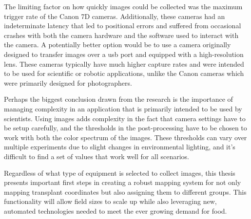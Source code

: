 The limiting factor on how quickly images could be collected was the maximum trigger rate of the Canon 7D cameras.  Additionally, these cameras had an indeterminate latency that led to positional errors and suffered from occasional crashes with both the camera hardware and the software used to interact with the camera.  A potentially better option would be to use a camera originally designed to transfer images over a \acf{usb} port and equipped with a high-resolution lens.  These cameras typically have much higher capture rates and were intended to be used for scientific or robotic applications, unlike the Canon cameras which were primarily designed for photographers. 

Perhaps the biggest conclusion drawn from the research is the importance of managing complexity in an application that is primarily intended to be used by scientists.  Using images adds complexity in the fact that camera settings have to be setup carefully, and the thresholds in the post-processing have to be chosen to work with both the color spectrum of the images.  These thresholds can vary over multiple experiments due to slight changes in environmental lighting, and it's difficult to find a set of values that work well for all scenarios.     

Regardless of what type of equipment is selected to collect images, this thesis presents important first steps in creating a robust mapping system for not only mapping transplant coordinates but also assigning them to different groups. This functionality will allow field sizes to scale up while also leveraging new, automated technologies needed to meet the ever growing demand for food.
